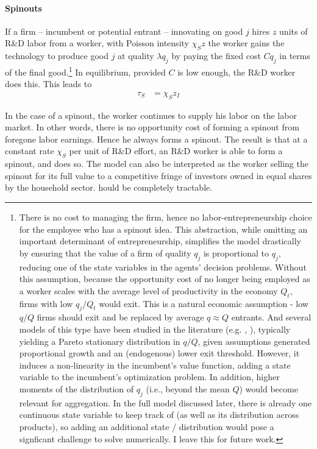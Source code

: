 \documentclass[11pt,english]{article}
\theoremstyle{remark}
\begin{document}
\paragraph{Spinouts} If a firm -- incumbent or potential entrant -- innovating on good $j$ hires $z$ units of R\&D labor from a worker, with Poisson intensity $\chi_S z$ the worker gains the technology to produce good $j$ at quality $\lambda q_j$ by paying the fixed cost $C q_j$ in terms of the final good.\footnote{There is no cost to managing the firm, hence no labor-entrepreneurship choice for the employee who has a spinout idea. This abstraction, while omitting an important determinant of entrepreneurship, simplifies the model drastically by ensuring that the value of a firm of quality $q_j$ is proportional to $q_j$, reducing one of the state variables in the agents' decision problems. Without this assumption, because the opportunity cost of no longer being employed as a worker scales with the average level of productivity in the economy $Q_t$, firms with low $q_j/Q_t$ would exit. This is a natural economic assumption - low $q/Q$ firms should exit and be replaced by average $q \approx Q$ entrants. And several models of this type have been studied in the literature (e.g. \cite{acemoglu_innovation_2015}, ), typically yielding a Pareto stationary distribution in $q/Q$, given assumptions generated proportional growth and an (endogenous) lower exit threshold. However, it induces a non-linearity in the incumbent's value function, adding a state variable to the incumbent's optimization problem. In addition, higher moments of the distribution of $q_j$ (i.e., beyond the mean $Q$) would become relevant for aggregation. In the full model discussed later, there is already one continuous state variable to keep track of (as well as its distribution across products), so adding an additional state / distribution would pose a signficant challenge to solve numerically. I leave this for future work.} In equilibrium, provided $C$ is low enough, the R\&D worker does this. This leads to
\begin{align}
	\tau_S &= \chi_S z_I \label{simplified_spinout_innovation_rate}
\end{align}

In the case of a spinout, the worker continues to supply his labor on the labor market. In other words, there is no opportunity cost of forming a spinout from foregone labor earnings. Hence he always forms a spinout. The result is that at a constant rate $\chi_S$ per unit of R\&D effort, an R\&D worker is able to form a spinout, and does so. The model can also be interpreted as the worker selling the spinout for its full value to a competitive fringe of investors owned in equal shares by the household sector. 
hould be completely tractable. 
\end{document}
